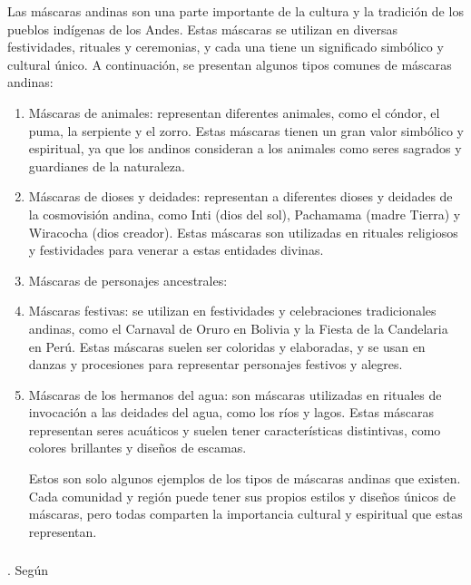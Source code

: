 \documentclass[12pt,a4paper]{article}
\begin{document}
Las máscaras andinas son una parte importante de la cultura y la tradición de los pueblos indígenas de los Andes. Estas máscaras se utilizan en diversas festividades, rituales y ceremonias, y cada una tiene un significado simbólico y cultural único. A continuación, se presentan algunos tipos comunes de máscaras andinas:
\begin{enumerate}
\item Máscaras de animales: representan diferentes animales, como el cóndor, el puma, la serpiente y el zorro. Estas máscaras tienen un gran valor simbólico y espiritual, ya que los andinos consideran a los animales como seres sagrados y guardianes de la naturaleza.

\item Máscaras de dioses y deidades: representan a diferentes dioses y deidades de la cosmovisión andina, como Inti (dios del sol), Pachamama (madre Tierra) y Wiracocha (dios creador). Estas máscaras son utilizadas en rituales religiosos y festividades para venerar a estas entidades divinas.

\item Máscaras de personajes ancestrales: %

\item Máscaras festivas: se utilizan en festividades y celebraciones tradicionales andinas, como el Carnaval de Oruro en Bolivia y la Fiesta de la Candelaria en Perú. Estas máscaras suelen ser coloridas y elaboradas, y se usan en danzas y procesiones para representar personajes festivos y alegres.

\item Máscaras de los hermanos del agua: son máscaras utilizadas en rituales de invocación a las deidades del agua, como los ríos y lagos. Estas máscaras representan seres acuáticos y suelen tener características distintivas, como colores brillantes y diseños de escamas.

Estos son solo algunos ejemplos de los tipos de máscaras andinas que existen. Cada comunidad y región puede tener sus propios estilos y diseños únicos de máscaras, pero todas comparten la importancia cultural y espiritual que estas representan.
\end{enumerate}


\subsubsection{\variabled}. Según %
\end{document}
